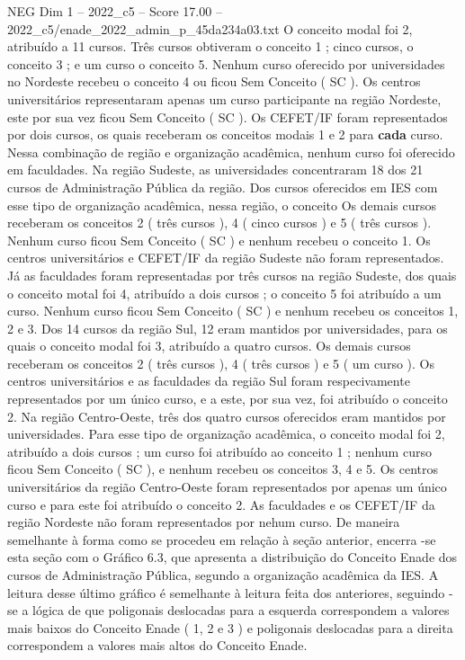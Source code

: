 \begin{textsample}{NEG Dim 1 – 2022\_c5 – Score 17.00 – 2022\_c5/enade\_2022\_admin\_p\_45da234a03.txt}
O conceito modal foi 2, atribuído a 11 cursos.
Três cursos obtiveram o conceito 1 ; cinco cursos, o conceito 3 ; e um curso o conceito 5.
Nenhum curso oferecido por universidades no Nordeste recebeu o conceito 4 ou ficou Sem Conceito ( SC ).
Os centros universitários representaram apenas um curso participante na região Nordeste, este por sua vez ficou Sem Conceito ( SC ).
Os CEFET/IF foram representados por dois cursos, os quais receberam os conceitos modais 1 e 2 para \textbf{cada} curso.
Nessa combinação de região e organização acadêmica, nenhum curso foi oferecido em faculdades.
Na região Sudeste, as universidades concentraram 18 dos 21 cursos de Administração Pública da região.
Dos cursos oferecidos em IES com esse tipo de organização acadêmica, nessa região, o conceito Os demais cursos receberam os conceitos 2 ( três cursos ), 4 ( cinco cursos ) e 5 ( três cursos ).
Nenhum curso ficou Sem Conceito ( SC ) e nenhum recebeu o conceito 1.
Os centros universitários e CEFET/IF da região Sudeste não foram representados.
Já as faculdades foram representadas por três cursos na região Sudeste, dos quais o conceito motal foi 4, atribuído a dois cursos ; o conceito 5 foi atribuído a um curso.
Nenhum curso ficou Sem Conceito ( SC ) e nenhum recebeu os conceitos 1, 2 e 3.
Dos 14 cursos da região Sul, 12 eram mantidos por universidades, para os quais o conceito modal foi 3, atribuído a quatro cursos.
Os demais cursos receberam os conceitos 2 ( três cursos ), 4 ( três cursos ) e 5 ( um curso ).
Os centros universitários e as faculdades da região Sul foram respecivamente representados por um único curso, e a este, por sua vez, foi atribuído o conceito 2.
Na região Centro-Oeste, três dos quatro cursos oferecidos eram mantidos por universidades.
Para esse tipo de organização acadêmica, o conceito modal foi 2, atribuído a dois cursos ; um curso foi atribuído ao conceito 1 ; nenhum curso ficou Sem Conceito ( SC ), e nenhum recebeu os conceitos 3, 4 e 5.
Os centros universitários da região Centro-Oeste foram representados por apenas um único curso e para este foi atribuído o conceito 2.
As faculdades e os CEFET/IF da região Nordeste não foram representados por nehum curso.
De maneira semelhante à forma como se procedeu em relação à seção anterior, encerra -se esta seção com o Gráfico 6.3, que apresenta a distribuição do Conceito Enade dos cursos de Administração Pública, segundo a organização acadêmica da IES.
A leitura desse último gráfico é semelhante à leitura feita dos anteriores, seguindo -se a lógica de que poligonais deslocadas para a esquerda correspondem a valores mais baixos do Conceito Enade ( 1, 2 e 3 ) e poligonais deslocadas para a direita correspondem a valores mais altos do Conceito Enade.

\end{textsample}
